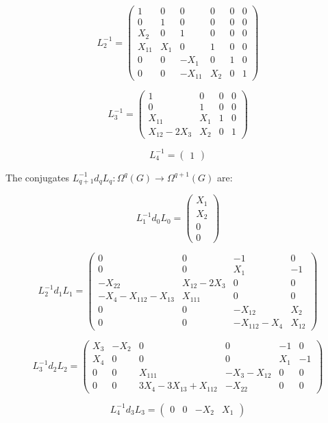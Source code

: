 \documentclass[reqno,12pt]{amsart}
\theoremstyle{plain}
\theoremstyle{definition}
\begin{document}
$$
L_2^{-1}=\left(\begin{array}{c|cc|cc|c}
1&0&0&0&0&0\\\hline
0&1&0&0&0&0\\
X_2&0&1&0&0&0\\\hline
X_{11}&X_1&0&1&0&0\\
0&0&-X_1&0&1&0\\\hline
0&0&-X_{11}&X_2&0&1
\end{array}\right)
$$

$$
L_3^{-1}=\left(\begin{array}{c|c|cc}
1&0&0&0\\\hline
0&1&0&0\\\hline
X_{11}&X_1&1&0\\
X_{12}-2X_3&X_2&0&1
\end{array}\right)
$$

$$
L_4^{-1}=\left(\begin{array}{c}
1
\end{array}\right)
$$

The conjugates $L_{q+1}^{-1}d_qL_q\colon\Omega^q(G)\to\Omega^{q+1}(G)$ are:

$$
L_1^{-1}d_0L_0=\left(\begin{array}{c}
X_1\\X_2\\\hline0\\\hline0
\end{array}\right)
$$

$$
L_2^{-1}d_1L_1=\left(\begin{array}{cc|c|c}
0&0&-1&0\\
\hline
0&0&X_1&-1\\
-X_{22}&X_{12}-2X_3&0&0\\
\hline
-X_4-X_{112}-X_{13}&X_{111}&0&0\\
0&0&-X_{12}&X_2\\
\hline
0&0&-X_{112}-X_4&X_{12}
\end{array}\right)
$$

$$
L_3^{-1}d_2L_2=\left(\begin{array}{c|cc|cc|c}
X_3&-X_2&0&0&-1&0\\\hline
X_4&0&0&0&X_1&-1\\\hline
0&0&X_{111}&-X_3-X_{12}&0&0\\
0&0&3X_4-3X_{13}+X_{112}&-X_{22}&0&0
\end{array}\right)
$$

$$
L_4^{-1}d_3L_3=\left(\begin{array}{c|c|cc}
0&0&-X_2&X_1
\end{array}\right)
$$
\end{document}
